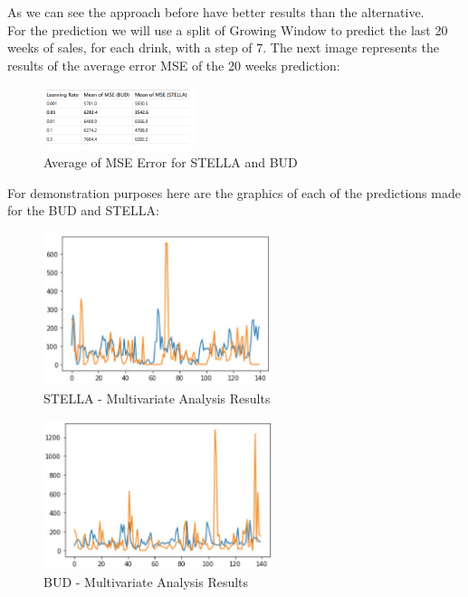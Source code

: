 As we can see the approach before have better results than the alternative.\\


For the prediction we will use a split of Growing Window to predict the last 20 weeks of sales, for each drink, with a step of 7. The next image represents the results of the average error MSE of the 20 weeks prediction:\\


\begin{figure}[H]
    \centering
    \includegraphics[width=0.4\textwidth]{assets/mult7.png}
    \caption{Average of MSE Error for STELLA and BUD}
    \label{fig:notas}
    \end{figure}

For demonstration purposes here are the graphics of each of the predictions made for the BUD and STELLA:\\

\begin{figure}[H]
    \centering
    \includegraphics[width=0.6\textwidth]{assets/multt-stella.jpeg}
    \caption{STELLA - Multivariate Analysis Results}
    \label{fig:notas}
    \end{figure}

\begin{figure}[H]
    \centering
    \includegraphics[width=0.6\textwidth]{assets/multt-bud.jpeg}
    \caption{BUD - Multivariate Analysis Results}
    \label{fig:notas}
    \end{figure}



